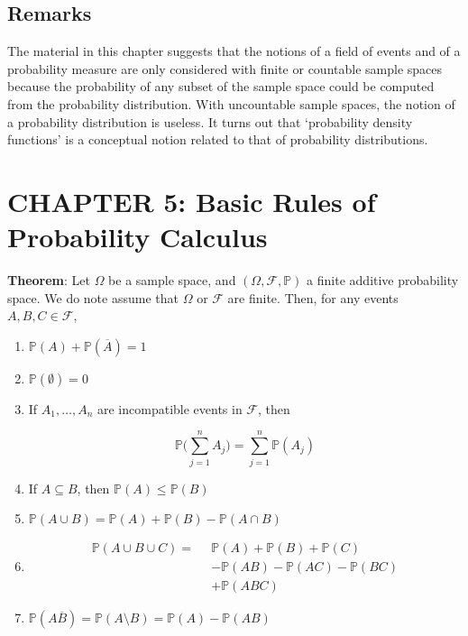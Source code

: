 \documentclass[12pt]{article}
\newcommand{\prob}[1]{\mathbb{P}(#1)}
\newcommand{\field}{\mathcal{F}}
\begin{document}
\subsection*{Remarks}
\noindent
The material in this chapter suggests that the notions of a field of events and of a probability measure are only considered with finite or countable sample spaces because the probability of any subset of the sample space could be computed from the probability distribution. With uncountable sample spaces, the notion of a probability distribution is useless. It turns out that `probability density functions' is a conceptual notion related to that of probability distributions.

\section*{CHAPTER 5: Basic Rules of Probability Calculus}
\noindent
\textbf{Theorem}: Let $\Omega$ be a sample space, and $(\Omega, \field, \mathbb{P})$ a finite additive probability space. We do note assume that $\Omega$ or $\field$ are finite. Then, for any events $A,B,C \in \field$,

\begin{enumerate}[label=(\roman*)]
\item $\prob{A} + \prob{\overline{A}} = 1$
\item $\prob{\emptyset}=0$
\item If $A_1, \ldots, A_n$ are incompatible events in $\field$, then

\begin{equation*}
\mathbb{P} \Big ( \sum_{j=1}^{n} A_j \Big ) = \sum_{j=1}^{n} \prob{A_j}
\end{equation*}

\item If $A \subseteq B$, then $\prob{A} \leq \prob{B}$
\item $\prob{A \cup  B} = \prob{A} + \prob{B} - \prob{A \cap B}$
\item 

\begin{align*}
\prob{A \cup B \cup C} =  \enspace & \prob{A} + \prob{B} + \prob{C} \\
& - \prob{AB} - \prob{AC} - \prob{BC} \\
& + \prob{ABC}
\end{align*}

\item $\prob{A\overline{B}} = \prob{A \setminus B} = \prob{A} - \prob{AB}$
\end{enumerate}
\end{document}
